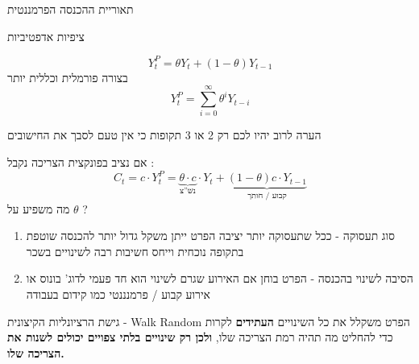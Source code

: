 \documentclass[usenames,dvipsnames]{beamer}
\begin{document}
\begin{RTL}
\begin{frame}[allowframebreaks]{תאוריית ההכנסה הפרמננטית}
\begin{block}{ציפיות אדפטיביות}
    \end{block}
    \[
            Y^P_t = \theta Y_t  +  (1-\theta)Y_{t-1}
            \]
            בצורה פורמלית וכללית יותר
            \[
            Y^P_t = \sum_{i=0}^{\infty} \theta^i Y_{t-i}
                \]
                \begin{alertblock}{הערה}
                    לרוב יהיו לכם רק 2 או 3 תקופות כי אין טעם לסבך את החישובים
                \end{alertblock}
    אם נציב בפונקצית הצריכה נקבל : 
    \begin{equation*}
        C_t = c\cdot Y^P_t = \underbrace{\theta\cdot c}_{\text{נש''צ}}\cdot Y_t  + \underbrace{ (1-\theta)c\cdot Y_{t-1}}_{\text{קבוע / חותך}}
    \end{equation*}
    מה משפיע על $\theta$ ?
    \begin{enumerate}
        \item סוג תעסוקה - ככל שתעסוקה יותר יציבה הפרט ייתן משקל גדול יותר להכנסה שוטפת בתקופה נוכחית וייחס חשיבות רבה לשינויים בשכר
        \item הסיבה לשינוי בהכנסה - הפרט בוחן אם האירוע שגרם לשינוי הוא חד פעמי לדוג' בונוס או אירוע קבוע / פרמנננטי כמו קידום בעבודה
    \end{enumerate}

    \framebreak
    \begin{block}{גישת הרציונליות הקיצונית - Walk Random}
        הפרט משקלל את כל השינויים \textbf{העתידים} לקרות כדי להחליט מה תהיה רמת הצריכה שלו, \textbf{ולכן רק שינויים בלתי צפויים יכולים לשנות את הצריכה שלו.}


        
    \end{block}
\end{frame}


\end{RTL}
\end{document}
